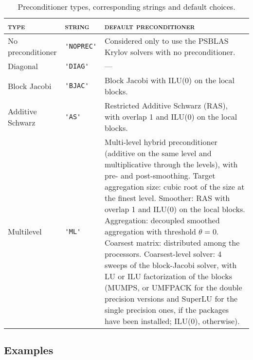 \begin{table}[th]
\begin{center}
\begin{tabular}{|l|l|p{7.8cm}|}
\hline
\textsc{type}       & \textsc{string} & \textsc{default preconditioner} \\ \hline
No preconditioner &\verb|'NOPREC'|& Considered only to use the PSBLAS
                                    Krylov solvers with no preconditioner. \\ \hline
Diagonal          & \verb|'DIAG'| & --- \\ \hline
Block Jacobi      & \verb|'BJAC'| & Block Jacobi with ILU(0) on the local blocks.\\ \hline
Additive Schwarz  & \verb|'AS'|   & Restricted Additive Schwarz (RAS),
                                    with overlap 1 and ILU(0) on the local blocks. \\ \hline
Multilevel        &\verb|'ML'|    & Multi-level hybrid preconditioner (additive on the
                                    same level and multiplicative through the levels),
                                    with pre- and post-smoothing.
                                    Target aggregation size: cubic
                                    root of the size at the finest
                                    level. Smoother: RAS with overlap 1 and ILU(0)
                                    on the local blocks.
                                    Aggregation: decoupled smoothed aggregation with
                                    threshold $\theta = 0$.
                                    Coarsest matrix: distributed among the processors.
                                    Coarsest-level solver: 
                                    4 sweeps of the block-Jacobi solver, 
                                    with LU or ILU factorization of the blocks
                                    (MUMPS, or UMFPACK for the double precision versions and
                                    SuperLU for the single precision ones, if the packages
                                    have been installed; ILU(0), otherwise).         \\
\hline
\end{tabular}
\end{center}

\caption{Preconditioner types, corresponding strings and default choices.
\label{tab:precinit}}
\end{table}

\subsection{Examples\label{sec:examples}}

